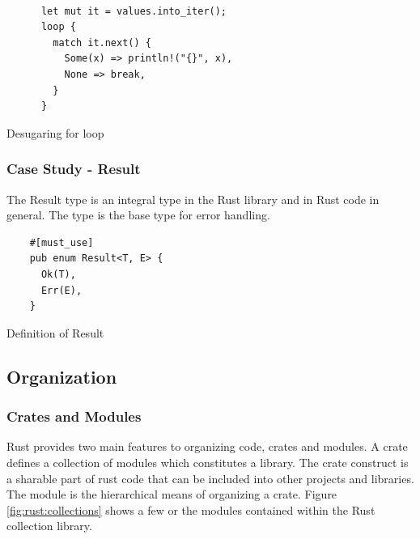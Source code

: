 \begin{minipage}[b]{0.5\linewidth}
  \begin{listing}[H]
    \begin{verbatim}

      let mut it = values.into_iter();
      loop {
        match it.next() {
          Some(x) => println!("{}", x),
          None => break,
        }
      }

    \end{verbatim}

    \caption{Desugaring for loop}
    \label{lst:rust:desugared-for}
  \end{listing}
\end{minipage}

\subsubsection{Case Study - Result}

The Result type is an integral type in the Rust library and in Rust code in general.
The type is the base type for error handling.

\begin{listing}[H]
  \begin{verbatim}
    #[must_use]
    pub enum Result<T, E> {
      Ok(T),
      Err(E),
    }
\end{verbatim}
\caption{Definition of Result}
\label{lst:rust:result}
\end{listing}

\subsection{Organization}
\label{ssub:rust:organization}

\subsubsection{Crates and Modules}

Rust provides two main features to organizing code, crates and modules.
A crate defines a collection of modules which constitutes a library.
The crate construct is a sharable part of rust code that can be included into other projects and libraries.
The module is the hierarchical means of organizing a crate.
Figure \ref{fig:rust:collections} shows a few or the modules contained within the Rust collection library.

